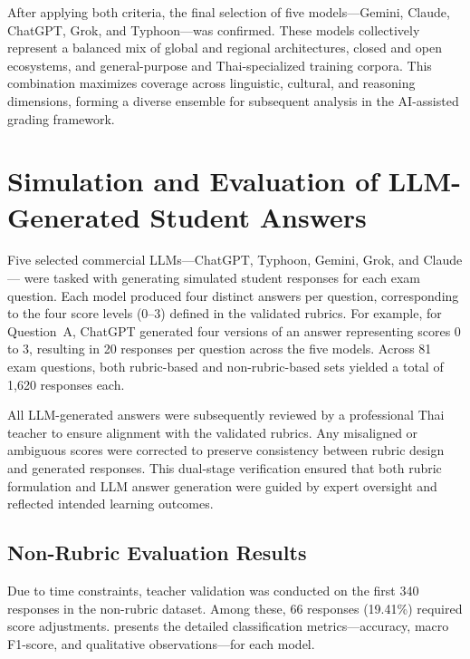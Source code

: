 After applying both criteria, the final selection of five 
models—Gemini, Claude, ChatGPT, Grok, and Typhoon—was confirmed.
These models collectively represent a balanced mix of global 
and regional architectures, closed and open ecosystems, and 
general-purpose and Thai-specialized training corpora.
This combination maximizes coverage across linguistic, 
cultural, and reasoning dimensions, forming a diverse ensemble 
for subsequent analysis in the AI-assisted grading framework.


\section{Simulation and Evaluation of LLM-Generated Student Answers}

Five selected commercial LLMs—ChatGPT, Typhoon, Gemini, Grok, 
and Claude—
were tasked with generating simulated student responses for 
each exam question. Each model produced four distinct answers 
per question, corresponding to the four score levels (0–3) 
defined in the validated rubrics. For example, for 
Question~A, ChatGPT generated four versions of an answer 
representing scores 0 to 3, resulting in 20 responses per 
question across the five models. Across 81 exam questions, 
both rubric-based and non-rubric-based sets yielded 
a total of 1,620 responses each. 

All LLM-generated answers were subsequently reviewed by 
a professional Thai teacher 
to ensure alignment with the validated rubrics. Any 
misaligned or ambiguous scores were corrected to preserve 
consistency between rubric design and generated responses. 
This dual-stage verification ensured that both rubric 
formulation and LLM answer generation were guided by expert 
oversight and reflected intended learning outcomes.

\subsection{Non-Rubric Evaluation Results}

Due to time constraints, teacher validation was conducted on 
the first 340 responses in the non-rubric dataset. Among these, 
66 responses (19.41\%) required score adjustments. 
 presents the detailed 
classification metrics—accuracy, macro F1-score, and 
qualitative observations—for each model.

